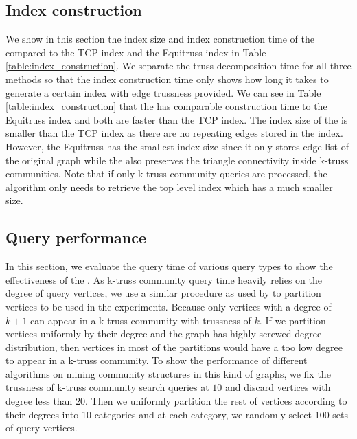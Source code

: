 \subsection{Index construction}
\label{eval_const}

We show in this section the index size and index construction time of the \twolevelindex{} compared to the TCP index and the Equitruss index in Table \ref{table:index_construction}. 
We separate the truss decomposition time for all three methods so that the index construction time only shows how long it takes to generate a certain index with edge trussness provided. 
We can see in Table \ref{table:index_construction} that the \twolevelindex{} has comparable construction time to the Equitruss index and both are faster than the TCP index. The index size of the \twolevelindex{} is smaller than the TCP index as there are no repeating edges stored in the index. However, the Equitruss has the smallest index size since it only stores edge list of the original graph while the \twolevelindex{} also preserves the triangle connectivity inside k-truss communities. Note that if only \toplevelprob{} k-truss community queries are processed, the algorithm only needs to retrieve the top level index which has a much smaller size. 

\subsection{Query performance}
\label{eval_query_time}

In this section, we evaluate the query time of various query types to show the effectiveness of the \twolevelindex{}. As k-truss community query time heavily relies on the degree of query vertices, we use a similar procedure as used by \cite{huang2014querying} to partition vertices to be used in the experiments. Because only vertices with a degree of $k + 1$ can appear in a k-truss community with trussness of $k$. If we partition vertices uniformly by their degree and the graph has highly screwed degree distribution, then vertices in most of the partitions would have a too low degree to appear in a k-truss community. To show the performance of different algorithms on mining community structures in this kind of graphs, we fix the trussness of k-truss community search queries at $10$ and discard vertices with degree less than $20$. Then we uniformly partition the rest of vertices according to their degrees into 10 categories and at each category, we randomly select 100 sets of query vertices.

